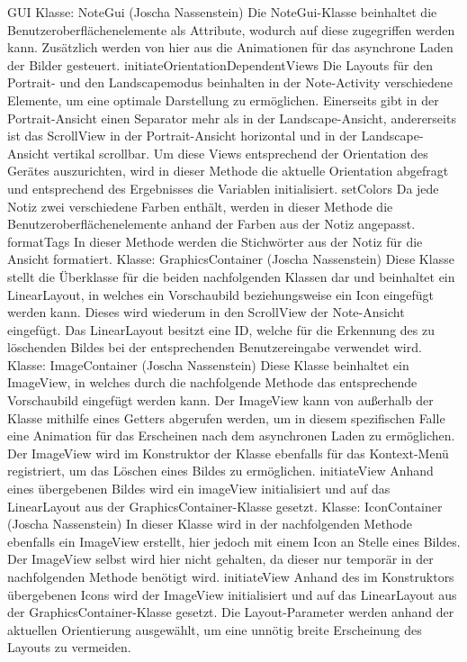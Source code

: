 GUI
Klasse: NoteGui (Joscha Nassenstein)
Die NoteGui-Klasse beinhaltet die Benutzeroberflächenelemente als Attribute, wodurch auf diese zugegriffen werden kann. Zusätzlich werden von hier aus die Animationen für das asynchrone Laden der Bilder gesteuert.
initiateOrientationDependentViews
Die Layouts für den Portrait- und den Landscapemodus beinhalten in der Note-Activity verschiedene Elemente, um eine optimale Darstellung zu ermöglichen. Einerseits gibt in der Portrait-Ansicht einen Separator mehr als in der Landscape-Ansicht, andererseits ist das ScrollView in der Portrait-Ansicht horizontal und in der Landscape-Ansicht vertikal scrollbar. Um diese Views entsprechend der Orientation des Gerätes auszurichten, wird in dieser Methode die aktuelle Orientation abgefragt und entsprechend des Ergebnisses die Variablen initialisiert.
setColors
Da jede Notiz zwei verschiedene Farben enthält, werden in dieser Methode die Benutzeroberflächenelemente anhand der Farben aus der Notiz angepasst.
formatTags
In dieser Methode werden die Stichwörter aus der Notiz für die Ansicht formatiert.
Klasse: GraphicsContainer (Joscha Nassenstein)
Diese Klasse stellt die Überklasse für die beiden nachfolgenden Klassen dar und beinhaltet ein LinearLayout, in welches ein Vorschaubild beziehungsweise ein Icon eingefügt werden kann. Dieses wird wiederum in den ScrollView der Note-Ansicht eingefügt. Das LinearLayout besitzt eine ID, welche für die Erkennung des zu löschenden Bildes bei der entsprechenden Benutzereingabe verwendet wird.
Klasse: ImageContainer (Joscha Nassenstein)
Diese Klasse beinhaltet ein ImageView, in welches durch die nachfolgende Methode das entsprechende Vorschaubild eingefügt werden kann. Der ImageView kann von außerhalb der Klasse mithilfe eines Getters abgerufen werden, um in diesem spezifischen Falle eine Animation für das Erscheinen nach dem asynchronen Laden zu ermöglichen. Der ImageView wird im Konstruktor der Klasse ebenfalls für das Kontext-Menü registriert, um das Löschen eines Bildes zu ermöglichen.
initiateView
Anhand eines übergebenen Bildes wird ein imageView initialisiert und auf das LinearLayout aus der GraphicsContainer-Klasse gesetzt.
Klasse: IconContainer (Joscha Nassenstein)
In dieser Klasse wird in der nachfolgenden Methode ebenfalls ein ImageView erstellt, hier jedoch mit einem Icon an Stelle eines Bildes. Der ImageView selbst wird hier nicht gehalten, da dieser nur temporär in der nachfolgenden Methode benötigt wird.
initiateView
Anhand des im Konstruktors übergebenen Icons wird der ImageView initialisiert und auf das LinearLayout aus der GraphicsContainer-Klasse gesetzt. Die Layout-Parameter werden anhand der aktuellen Orientierung ausgewählt, um eine unnötig breite Erscheinung des Layouts zu vermeiden.

